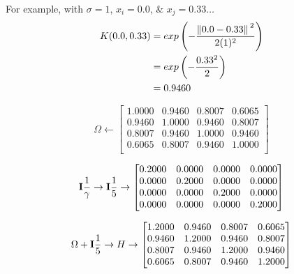 \documentclass[a4paper,12pt]{scrreprt}
\begin{document}
For example, with $\sigma=1$, $x_i=0.0$, \& $x_j = 0.33\dots$
\begin{equation}
        \begin{split}
                K(0.0,0.33) & = exp\left(-\frac{\norm*{0.0-0.33}^2}{2(1)^2}\right) \\
                & = exp\left(-\frac{0.33^2}{2}\right) \\
                & = 0.9460
        \end{split}
\end{equation}

\begin{equation}
        \Omega\gets
        \begin{bmatrix}
                1.0000 & 0.9460 & 0.8007 & 0.6065 \\
                0.9460 & 1.0000 & 0.9460 & 0.8007 \\
                0.8007 & 0.9460 & 1.0000 & 0.9460 \\
                0.6065 & 0.8007 & 0.9460 & 1.0000 \\
        \end{bmatrix}
\end{equation}

\begin{equation}
        \vb{I}\frac{1}{\gamma}\to\vb{I}\frac{1}{5}\to
        \begin{bmatrix}
                0.2000 & 0.0000 & 0.0000 & 0.0000 \\
                0.0000 & 0.2000 & 0.0000 & 0.0000 \\
                0.0000 & 0.0000 & 0.2000 & 0.0000 \\
                0.0000 & 0.0000 & 0.0000 & 0.2000
        \end{bmatrix}
\end{equation}

\begin{equation}
        \Omega+\vb{I}\frac{1}{5}\to H\to \begin{bmatrix}
                1.2000 & 0.9460 & 0.8007 & 0.6065 \\
                0.9460 & 1.2000 & 0.9460 & 0.8007 \\
                0.8007 & 0.9460 & 1.2000 & 0.9460 \\
                0.6065 & 0.8007 & 0.9460 & 1.2000 \\
        \end{bmatrix}
\end{equation}
\end{document}
